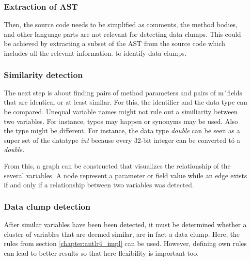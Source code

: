 \subsubsection{Extraction of AST}
Then,  the source code needs to be simplified as comments, the method bodies, and other language parts are not relevant for detecting data clumps. This could be achieved by extracting a subset of the \ac{AST} from the source code which includes all the relevant information. to identify data clumps.
\subsubsection{Similarity detection}

The next step is about finding pairs of method parameters and pairs of m´fields that are identical or at least similar.  For this, the identifier and the  data type  can be compared. Unequal variable names might not rule out a similiarity between two variables. For instance, typos may happen or synonyms may be used. Also the type might be different. For instance, the data type \textit{double} can be seen as a super set of the datatype \textit{int} because every 32-bit integer can be converted tó a \textit{double}.

From this, a graph can be constructed that visualizes the relationship of the several variables. A node represent a parameter or field value while an edge exists if and only if a relationship between two variables was detected. 

\subsubsection{Data clump detection}
After similar variables have been been detected, it must be determined whether a cluster of variables that are deemed similar, are in fact a data clump. Here, the rules from section \ref{chapter:antlr4_impl} can be used. However, defining own rules can lead to better results so that  here flexibility is important too. 



